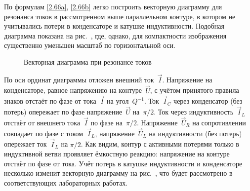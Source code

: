 По формулам \eqref{2.66a}, \eqref{2.66b} легко построить векторную диаграмму для резонанса токов в рассмотренном выше параллельном контуре, в котором не учитывались потери в конденсаторе и катушке индуктивности. Подобная диаграмма показана на рис.~, где, однако, для компактности изображения существенно уменьшен масштаб по горизонтальной оси.

\begin{figure}[h!]
	\centering
	\caption{Векторная диаграмма при резонансе токов}
\end{figure}

По оси ординат диаграммы отложен внешний ток~$\vec I$. Напряжение на конденсаторе, равное
напряжению на контуре~$\vec U$, с учётом принятого правила знаков отстаёт по
фазе от тока~$\vec I$ на угол~$Q^{-1}$. Ток~$\vec I_C$ через конденсатор (без
потерь) опережает по фазе напряжение~$\vec U$ на~$\pi/2$. Ток через
индуктивность~$\vec I_L$ отстаёт от внешнего тока~$\vec I$ по фазе на~$\pi/2$.
Напряжение~$\vec U_R$ на сопротивлении совпадает по фазе с током~$\vec I_L$,
напряжение~$\vec U_L$ на индуктивности (без потерь) опережает ток~$\vec I_L$ на
$\pi/2$. Как видим, контур с активными потерями только в индуктивной ветви
проявляет ёмкостную реакцию: напряжение на контуре отстаёт по фазе от тока. Учёт
потерь в катушке индуктивности и конденсаторе несколько изменит векторную
диаграмму на рис.~, что будет рассмотрено в соответствующих
лабораторных работах.

